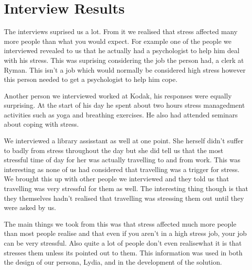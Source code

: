 \documentclass{scrartcl}
\begin{document}

\section{Interview Results}
The interviews suprised us a lot. From it we realised that stress
affected many more people than what you would expect. For example 
one of the people we interviewed revealed to us that he actually
had a psychologist to help him deal with his stress. This was
suprising considering the job the person had, a clerk at Ryman.
This isn't a job which would normally be considered high stress
however this person needed to get a psychologist to help him cope.

Another person we interviewed worked at Kodak, his responses were 
equally surprising. At the start of his day he spent about two hours
stress managedment activities such as yoga and breathing exercises.
He also had attended seminars about coping with stress.

We interviewed a library assisstant as well at one point. She 
herself didn't suffer to badly from stress throughout the day
but she did tell us that the most stressful time of day for her was
actually travelling to and from work. This was interesting as
none of us had considered that travelling was a trigger for stress.
We brought this up with other people we interviewed and they told
us that travelling was very stressful for them as well. The
interesting thing though is that they themselves hadn't realised
that travelling was stressing them out until they were asked by
us.

The main things we took from this was that stress affected much
more people than most people realise and that even if you aren't
in a high stress job, your job can be very stressful. Also 
quite a lot of people don't even realisewhat it is that stresses
them unless its pointed out to them. This information was used
in both the design of our persona, Lydia, and in the development 
of the solution.
\end{document}
